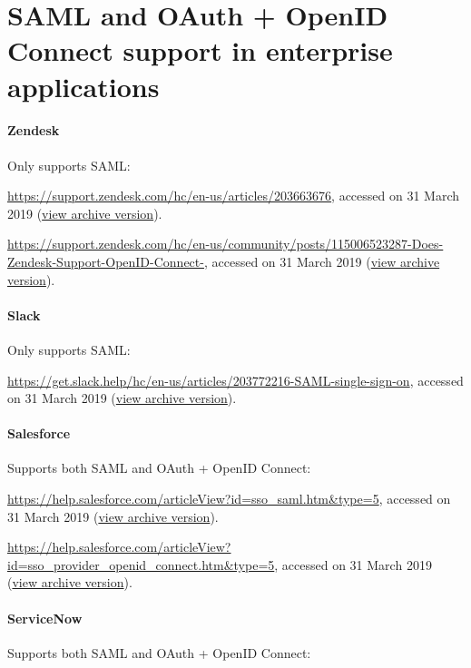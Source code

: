 \section{SAML and OAuth + OpenID Connect support in enterprise applications}\label{sec:appendix-links}

\paragraph{Zendesk} Only supports SAML:

\url{https://support.zendesk.com/hc/en-us/articles/203663676}, accessed on 31 March 2019 (\href{https://web.archive.org/web/20190331182733/https://support.zendesk.com/hc/en-us/articles/203663676}{view archive version}).

\url{https://support.zendesk.com/hc/en-us/community/posts/115006523287-Does-Zendesk-Support-OpenID-Connect-}, accessed on 31 March 2019 (\href{https://web.archive.org/web/20190331182849/https://support.zendesk.com/hc/en-us/community/posts/115006523287-Does-Zendesk-Support-OpenID-Connect-}{view archive version}).

\paragraph{Slack} Only supports SAML:

\url{https://get.slack.help/hc/en-us/articles/203772216-SAML-single-sign-on}, accessed on 31 March 2019 (\href{https://web.archive.org/web/20190331183030/https://get.slack.help/hc/en-us/articles/203772216-SAML-single-sign-on}{view archive version}).

\paragraph{Salesforce} Supports both SAML and OAuth + OpenID Connect:

\url{https://help.salesforce.com/articleView?id=sso_saml.htm&type=5}, accessed on 31 March 2019 (\href{https://web.archive.org/web/20190331183852/https://help.salesforce.com/articleView?id=sso_saml.htm&type=5}{view archive version}).

\url{https://help.salesforce.com/articleView?id=sso_provider_openid_connect.htm&type=5}, accessed on 31 March 2019 (\href{https://web.archive.org/web/20190331184051/https://help.salesforce.com/articleView?id=sso_provider_openid_connect.htm&type=5}{view archive version}).

\paragraph{ServiceNow} Supports both SAML and OAuth + OpenID Connect:

